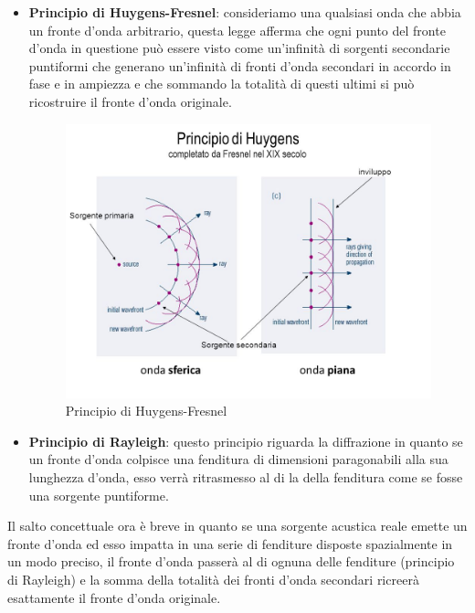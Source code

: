 \documentclass[12pt,a4paper]{report}
\begin{document}
\begin{itemize}

\item \textbf{Principio di Huygens-Fresnel}: consideriamo una qualsiasi onda che abbia un fronte d'onda arbitrario, questa legge afferma che ogni punto del fronte d'onda in questione può essere visto come un'infinità di sorgenti secondarie puntiformi che generano un'infinità di fronti d'onda secondari in accordo in fase e in ampiezza e che sommando la totalità di questi ultimi si può ricostruire il fronte d'onda originale.



\begin{figure}[htbp]
	\centering
	\includegraphics[scale=0.35]{figures/huygens.jpg}
	\caption {Principio di Huygens-Fresnel} 
	\label{fig:huygens}
	\end{figure}

\item \textbf{Principio di Rayleigh}: questo principio riguarda la diffrazione in quanto se un fronte d'onda colpisce una fenditura di dimensioni paragonabili alla sua lunghezza d'onda, esso verrà ritrasmesso al di la della fenditura come se fosse una sorgente puntiforme.

\end{itemize}

Il salto concettuale ora è breve in quanto se una sorgente acustica reale emette un fronte d'onda ed esso impatta in una serie di fenditure disposte spazialmente in un modo preciso, il fronte d'onda passerà al di ognuna delle fenditure (principio di Rayleigh) e la somma della totalità dei fronti d'onda secondari ricreerà esattamente il fronte d'onda originale.
\end{document}
